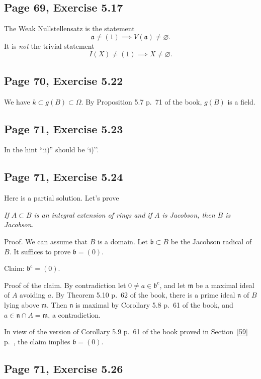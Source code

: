 \documentclass[parskip=half,fontsize=12pt]{scrartcl}%
\newcommand{\oo}{\operatorname}\newcommand{\ooo}{\operatorname*}
\newcommand{\mf}{\mathfrak}
\begin{document}
\subsection{Page 69, Exercise 5.17}%

The Weak Nullstellensatz is the statement
$$
\mf a\ne(1)\implies V(\mf a)\ne\varnothing.
$$ 
It is \emph{not} the trivial statement 
$$
I(X)\ne(1)\implies X\ne\varnothing.
$$

\subsection{Page 70, Exercise 5.22}%

We have $k\subset g(B)\subset\Omega$. By Proposition 5.7 p.~71 of the book, $g(B)$ is a field.

\subsection{Page 71, Exercise 5.23}%

In the hint ``ii)'' should be `i)''.

\subsection{Page 71, Exercise 5.24}%

Here is a partial solution. Let's prove 

\emph{If $A\subset B$ is an integral extension of rings and if $A$ is Jacobson, then $B$ is Jacobson.}

Proof. %
We can assume that $B$ is a domain. Let $\mf b\subset B$ be the Jacobson radical of $B$. It suffices to prove $\mf b=(0)$.

Claim: $\mf b^{\oo c}=(0)$. 

Proof of the claim. By contradiction let $0\ne a\in\mf b^{\oo c}$, and let $\mf m$ be a maximal ideal of $A$ avoiding $a$. By Theorem 5.10 p.~62 of the book, there is a prime ideal $\mf n$ of $B$ lying above $\mf m$. Then $\mf n$ is maximal by Corollary 5.8 p.~61 of the book, and $a\in\mf n\cap A=\mf m$, a contradiction.

In view of the version of Corollary 5.9 p.~61 of the book proved in Section~\ref{59} p.~\pageref{59}, the claim implies $\mf b=(0)$.

\subsection{Page 71, Exercise 5.26}%
\end{document}
